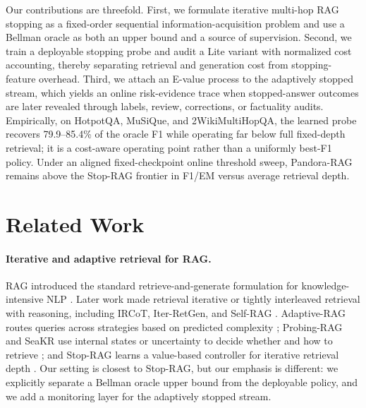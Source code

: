 \documentclass{article}
\newcommand{\method}{Pandora-RAG}
\newcommand{\hotpot}{HotpotQA}
\newcommand{\musique}{MuSiQue}
\newcommand{\twowiki}{2WikiMultiHopQA}
\begin{document}
Our contributions are threefold. First, we formulate iterative multi-hop RAG stopping as a fixed-order sequential information-acquisition problem and use a Bellman oracle as both an upper bound and a source of supervision. Second, we train a deployable stopping probe and audit a Lite variant with normalized cost accounting, thereby separating retrieval and generation cost from stopping-feature overhead. Third, we attach an E-value process to the adaptively stopped stream, which yields an online risk-evidence trace when stopped-answer outcomes are later revealed through labels, review, corrections, or factuality audits. Empirically, on \hotpot{}, \musique{}, and \twowiki{}, the learned probe recovers 79.9--85.4\% of the oracle F1 while operating far below full fixed-depth retrieval; it is a cost-aware operating point rather than a uniformly best-F1 policy. Under an aligned fixed-checkpoint online threshold sweep, \method{} remains above the Stop-RAG frontier in F1/EM versus average retrieval depth.

\section{Related Work}
\label{sec:related}

\paragraph{Iterative and adaptive retrieval for RAG.}
RAG introduced the standard retrieve-and-generate formulation for knowledge-intensive NLP \citep{lewisRetrievalAugmentedGenerationKnowledgeIntensive2020}. Later work made retrieval iterative or tightly interleaved retrieval with reasoning, including IRCoT, Iter-RetGen, and Self-RAG \citep{trivediInterleavingRetrievalChainofThought2023,shaoEnhancingRetrievalAugmentedLarge2023,asaiSelfRAGLearningRetrieve2023}. Adaptive-RAG routes queries across strategies based on predicted complexity \citep{jeongAdaptiveRAGLearningAdapt2024a}; Probing-RAG and SeaKR use internal states or uncertainty to decide whether and how to retrieve \citep{baekProbingRAGSelfProbingGuide2025,yaoSeaKRSelfawareKnowledge2025}; and Stop-RAG learns a value-based controller for iterative retrieval depth \citep{parkStopRAGValueBasedRetrieval2025}. Our setting is closest to Stop-RAG, but our emphasis is different: we explicitly separate a Bellman oracle upper bound from the deployable policy, and we add a monitoring layer for the adaptively stopped stream.
\end{document}
